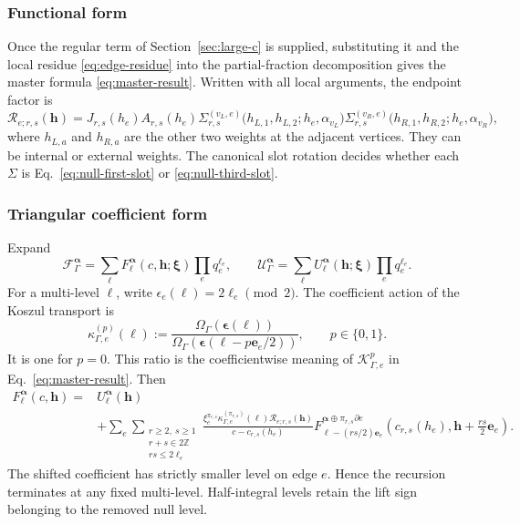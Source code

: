 \documentclass[11pt]{article}
\newcommand{\F}{\mathcal F}
\newcommand{\U}{\mathcal U}
\newcommand{\Rcal}{\mathcal R}
\newcommand{\ve}{\bm e}
\begin{document}
\subsubsection{Functional form}

Once the regular term of Section~\ref{sec:large-c} is supplied, substituting it and the local residue
\eqref{eq:edge-residue} into the partial-fraction decomposition gives the
master formula \eqref{eq:master-result}.  Written with all local arguments,
the endpoint factor is
\begin{equation}
 \Rcal_{e;r,s}(\bm h)
 =J_{r,s}(h_e)A_{r,s}(h_e)
 \Sigma_{r,s}^{(v_L,e)}
 \bigl(h_{L,1},h_{L,2};h_e,\alpha_{v_L}\bigr)
 \Sigma_{r,s}^{(v_R,e)}
 \bigl(h_{R,1},h_{R,2};h_e,\alpha_{v_R}\bigr),
 \label{eq:residue-all-arguments}
\end{equation}
where \(h_{L,a}\) and \(h_{R,a}\) are the other two weights at the adjacent
vertices.  They can be internal or external weights.  The canonical slot
rotation decides whether each \(\Sigma\) is
Eq.~\eqref{eq:null-first-slot} or \eqref{eq:null-third-slot}.

\subsubsection{Triangular coefficient form}

Expand
\begin{equation}
 \F_\Gamma^{\bm\alpha}
 =\sum_{\bm\ell}
 F_{\bm\ell}^{\bm\alpha}(c,\bm h;\bm\xi)
 \prod_e q_e^{\ell_e},
 \qquad
 \U_\Gamma^{\bm\alpha}
 =\sum_{\bm\ell}
 U_{\bm\ell}^{\bm\alpha}(\bm h;\bm\xi)
 \prod_e q_e^{\ell_e}.
 \label{eq:coefficient-expansion}
\end{equation}
For a multi-level \(\bm\ell\), write
\(\epsilon_e(\bm\ell)=2\ell_e\pmod2\).  The coefficient action of the
Koszul transport is
\begin{equation}
 \kappa_{\Gamma,e}^{(p)}(\bm\ell)
 :=\frac{\Omega_\Gamma(\bm\epsilon(\bm\ell))}
          {\Omega_\Gamma(\bm\epsilon(\bm\ell-p\ve_e/2))},
 \qquad p\in\{0,1\}.
 \label{eq:koszul-transport-coefficient}
\end{equation}
It is one for \(p=0\).  This ratio is the coefficientwise meaning of
\(\mathcal K_{\Gamma,e}^{p}\) in Eq.~\eqref{eq:master-result}.
Then
\begin{equation}
\boxed{
\begin{aligned}
 F_{\bm\ell}^{\bm\alpha}(c,\bm h)
 ={}&U_{\bm\ell}^{\bm\alpha}(\bm h)
 \\
 &+\sum_{e}
 \sum_{\substack{r\ge2,\ s\ge1\\
                  r+s\in2\mathbb Z\\
                  rs\le2\ell_e}}
 \frac{\xi_e^{\pi_{r,s}}
       \kappa_{\Gamma,e}^{(\pi_{r,s})}(\bm\ell)
       \Rcal_{e;r,s}(\bm h)}{c-c_{r,s}(h_e)}
 F_{\bm\ell-(rs/2)\ve_e}^{
    \bm\alpha\oplus\pi_{r,s}\partial e}
 \left(c_{r,s}(h_e),
       \bm h+\frac{rs}{2}\ve_e\right).
\end{aligned}}
\label{eq:coefficient-recursion}
\end{equation}
The shifted coefficient has strictly smaller level on edge \(e\).  Hence the
recursion terminates at any fixed multi-level.  Half-integral levels retain
the lift sign belonging to the removed null level.
\end{document}
